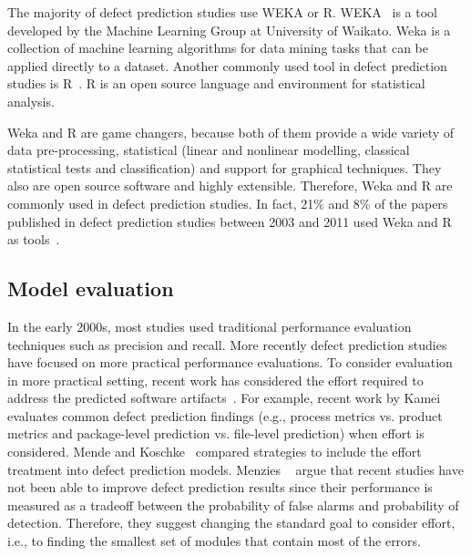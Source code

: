 \begin{oframed}
\vspace{-0.2cm}
The majority of defect prediction studies use WEKA or R. WEKA~\cite{WEKA} is a tool developed by the Machine Learning Group at University of Waikato. Weka is a collection of machine learning algorithms for data mining tasks that can be applied directly to a dataset. Another commonly used tool in defect prediction studies is R~\cite{R}. R is an open source language and environment for statistical analysis.

Weka and R are game changers, because both of them provide a wide variety of data pre-processing, statistical (linear and nonlinear modelling, classical statistical tests and classification) and support for graphical techniques. They also are open source software and highly extensible. Therefore, Weka and R are commonly used in defect prediction studies. In fact, 21\% and 8\% of the papers published in defect prediction studies between 2003 and 2011 used Weka and R as tools~\cite{Shihab2012PhD}. 
\end{oframed}


\subsection{Model evaluation}

In the early 2000s, most studies used traditional performance evaluation techniques such as precision and recall. More recently defect prediction studies have focused on more practical performance evaluations. To consider evaluation in more practical setting, recent work has considered the effort required to address the predicted software artifacts~\cite{Kamei2010ICSM, Mende2010CSMR, Menzies2010ESE}. 
For example, recent work by Kamei \ea ~\cite{Kamei2010ICSM} evaluates common defect prediction findings (e.g., process metrics vs. product metrics and package-level prediction vs. file-level prediction) when effort is considered. 
Mende and Koschke~\cite{Mende2010CSMR} compared strategies to include the effort treatment into defect prediction models.
Menzies \ea ~\cite{Menzies2010ESE} argue that recent studies have not been able to improve defect prediction results since their performance is measured as a tradeoff between the probability of false alarms and probability of detection. Therefore, they suggest changing the standard goal to consider effort, i.e., to finding the smallest set of modules that contain most of the errors.

